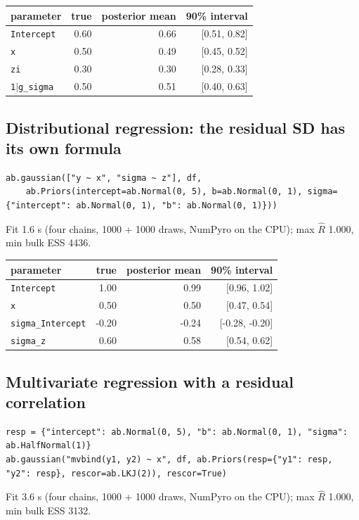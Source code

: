 \documentclass[11pt]{article}
\newcommand{\code}[1]{\texttt{#1}}
\begin{document}
\begin{center}\begin{tabular}{@{}lrrr@{}}\toprule parameter & true & posterior mean & 90\% interval \\ \midrule
\code{Intercept} & 0.60 & 0.66 & [0.51, 0.82] \\
\code{x} & 0.50 & 0.49 & [0.45, 0.52] \\
\code{zi} & 0.30 & 0.30 & [0.28, 0.33] \\
\code{1$|$g\_sigma} & 0.50 & 0.51 & [0.40, 0.63] \\
\bottomrule\end{tabular}\end{center}\normalsize

\subsection*{Distributional regression: the residual SD has its own formula}
\begin{lstlisting}
ab.gaussian(["y ~ x", "sigma ~ z"], df,
    ab.Priors(intercept=ab.Normal(0, 5), b=ab.Normal(0, 1), sigma={"intercept": ab.Normal(0, 1), "b": ab.Normal(0, 1)}))
\end{lstlisting}
\noindent\small Fit 1.6 s (four chains, 1000 + 1000 draws, NumPyro on the CPU); max $\hat R$ 1.000, min bulk ESS 4436.

\begin{center}\begin{tabular}{@{}lrrr@{}}\toprule parameter & true & posterior mean & 90\% interval \\ \midrule
\code{Intercept} & 1.00 & 0.99 & [0.96, 1.02] \\
\code{x} & 0.50 & 0.50 & [0.47, 0.54] \\
\code{sigma\_Intercept} & -0.20 & -0.24 & [-0.28, -0.20] \\
\code{sigma\_z} & 0.60 & 0.58 & [0.54, 0.62] \\
\bottomrule\end{tabular}\end{center}\normalsize

\subsection*{Multivariate regression with a residual correlation}
\begin{lstlisting}
resp = {"intercept": ab.Normal(0, 5), "b": ab.Normal(0, 1), "sigma": ab.HalfNormal(1)}
ab.gaussian("mvbind(y1, y2) ~ x", df, ab.Priors(resp={"y1": resp, "y2": resp}, rescor=ab.LKJ(2)), rescor=True)
\end{lstlisting}
\noindent\small Fit 3.6 s (four chains, 1000 + 1000 draws, NumPyro on the CPU); max $\hat R$ 1.000, min bulk ESS 3132.
\end{document}
